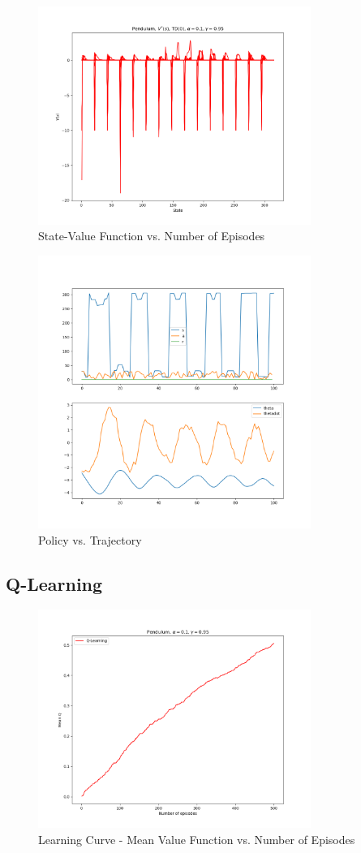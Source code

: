 \documentclass[conference]{IEEEtran}
\begin{document}
\begin{figure}[!htbp]
\centerline{\includegraphics[width=3.5in]{p_sarsa_state_value}}
\caption{State-Value Function vs. Number of Episodes}
\label{fig}
\end{figure}
\FloatBarrier

\begin{figure}[!htbp]
\centerline{\includegraphics[width=3.5in]{p_sarsa_policy_vs_trajec}}
\caption{Policy vs. Trajectory}
\label{fig}
\end{figure}
\FloatBarrier

\subsection{Q-Learning}

\begin{figure}[!htbp]
\centerline{\includegraphics[width=3.5in]{p_ql_learning_curve}}
\caption{Learning Curve - Mean Value Function vs. Number of Episodes}
\label{fig}
\end{figure}
\FloatBarrier
\end{document}
